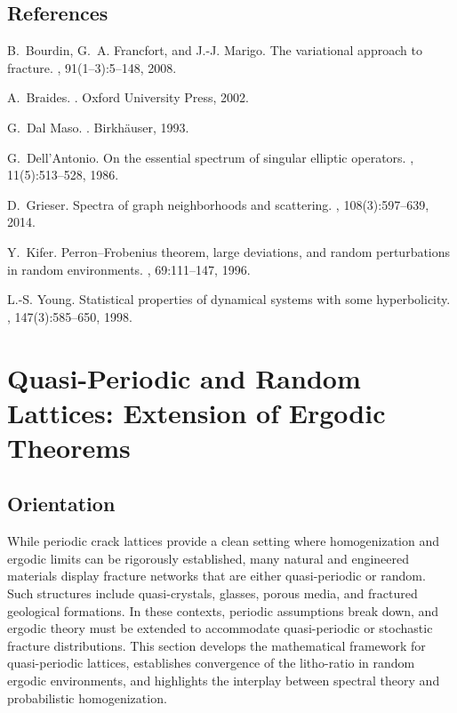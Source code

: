\subsection*{References}
\begin{thebibliography}{99}

B.~Bourdin, G.~A. Francfort, and J.-J. Marigo.
\newblock The variational approach to fracture.
, 91(1--3):5--148, 2008.

A.~Braides.
.
\newblock Oxford University Press, 2002.

G.~Dal Maso.
.
\newblock Birkhäuser, 1993.

G.~Dell’Antonio.
\newblock On the essential spectrum of singular elliptic operators.
, 11(5):513--528, 1986.

D.~Grieser.
\newblock Spectra of graph neighborhoods and scattering.
, 108(3):597--639, 2014.

Y.~Kifer.
\newblock Perron–Frobenius theorem, large deviations, and random perturbations in random environments.
, 69:111--147, 1996.

L.-S. Young.
\newblock Statistical properties of dynamical systems with some hyperbolicity.
, 147(3):585--650, 1998.

\end{thebibliography}

\section{Quasi-Periodic and Random Lattices: Extension of Ergodic Theorems}

\subsection*{Orientation}
While periodic crack lattices provide a clean setting where homogenization and
ergodic limits can be rigorously established, many natural and engineered
materials display fracture networks that are either quasi-periodic or random.
Such structures include quasi-crystals, glasses, porous media, and fractured
geological formations. In these contexts, periodic assumptions break down,
and ergodic theory must be extended to accommodate quasi-periodic or stochastic
fracture distributions. This section develops the mathematical framework for
quasi-periodic lattices, establishes convergence of the litho-ratio in random
ergodic environments, and highlights the interplay between spectral theory
and probabilistic homogenization.


